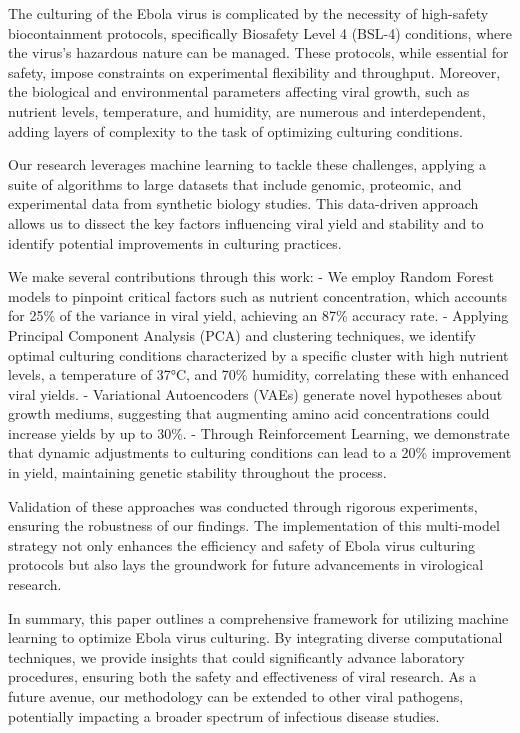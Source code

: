 \documentclass{article}
\begin{document}
The culturing of the Ebola virus is complicated by the necessity of high-safety biocontainment protocols, specifically Biosafety Level 4 (BSL-4) conditions, where the virus's hazardous nature can be managed. These protocols, while essential for safety, impose constraints on experimental flexibility and throughput. Moreover, the biological and environmental parameters affecting viral growth, such as nutrient levels, temperature, and humidity, are numerous and interdependent, adding layers of complexity to the task of optimizing culturing conditions.

Our research leverages machine learning to tackle these challenges, applying a suite of algorithms to large datasets that include genomic, proteomic, and experimental data from synthetic biology studies. This data-driven approach allows us to dissect the key factors influencing viral yield and stability and to identify potential improvements in culturing practices.

We make several contributions through this work: 
- We employ Random Forest models to pinpoint critical factors such as nutrient concentration, which accounts for 25\% of the variance in viral yield, achieving an 87\% accuracy rate.
- Applying Principal Component Analysis (PCA) and clustering techniques, we identify optimal culturing conditions characterized by a specific cluster with high nutrient levels, a temperature of 37°C, and 70\% humidity, correlating these with enhanced viral yields.
- Variational Autoencoders (VAEs) generate novel hypotheses about growth mediums, suggesting that augmenting amino acid concentrations could increase yields by up to 30\%.
- Through Reinforcement Learning, we demonstrate that dynamic adjustments to culturing conditions can lead to a 20\% improvement in yield, maintaining genetic stability throughout the process.

Validation of these approaches was conducted through rigorous experiments, ensuring the robustness of our findings. The implementation of this multi-model strategy not only enhances the efficiency and safety of Ebola virus culturing protocols but also lays the groundwork for future advancements in virological research.

In summary, this paper outlines a comprehensive framework for utilizing machine learning to optimize Ebola virus culturing. By integrating diverse computational techniques, we provide insights that could significantly advance laboratory procedures, ensuring both the safety and effectiveness of viral research. As a future avenue, our methodology can be extended to other viral pathogens, potentially impacting a broader spectrum of infectious disease studies.
\end{document}
